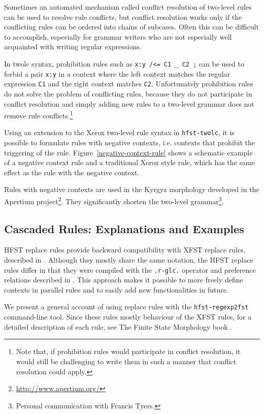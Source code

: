 \documentclass{llncs}
\begin{document}
Sometimes an automated mechanism called conflict resolution of
two-level rules~\cite{silfverberg/2009/2} can be used to resolve rule
conflicts, but conflict resolution works only if the conflicting rules
can be ordered into chains of subcases. Often this can be difficult
to accomplish, especially for grammar writers who are not especially
well acquainted with writing regular expressions.

In twolc syntax, prohibition rules such as {\tt x:y /<= C1 \_ C2 ;}
can be used to forbid a pair {\tt x:y} in a context where the left
context matches the regular expression {\tt C1} and the right context
matches {\tt C2}. Unfortunately prohibition rules do not solve the
problem of conflicting rules, because they do not participate in conflict
resolution and simply adding new rules to a two-level grammar does not
remove rule conflicts.\footnote{Note that, if prohibition rules would
  participate in conflict resolution, it would still be challenging to
  write them in such a manner that conflict resolution could apply.}

Using an extension to the Xerox two-level rule syntax in
\verb|hfst-twolc|, it is possible to formulate rules with negative
contexts, i.e. contexts that prohibit the triggering of the
rule. Figure~\ref{negative-context-rule} shows a schematic example of
a negative context rule and a traditional Xerox style rule, which has
the same effect as the rule with the negative context.

Rules with negative contexts are used in the Kyrgyz morphology
developed in the Apertium project\footnote{\url{http://www.apertium.org/}}.
They significantly shorten the two-level
grammar\footnote{Personal communication with Francis Tyers.}.


\subsection{Cascaded Rules: Explanations and Examples}

HFST replace rules provide backward compatibility with XFST replace rules, 
described in \cite{Kempe96parallelreplacement,beesley/2003}. 
Although they mostly share the same notation, the HFST replace rules differ in that
they were compiled with the \verb!.r-glc.! operator \cite{Gerdemann/1999} and preference
relations described in \cite{ylijyra/2008b}. This approach makes it possible to more freely
define contexts in parallel rules and to easily add new functionalities in future.

We present a general account of using replace rules with the \verb!hfst-regexp2fst!
command-line tool. Since these rules mostly behaviour of the XFST rules,
for a detailed description of each rule, see The Finite State Morphology book \cite{beesley/2003}.
\end{document}

